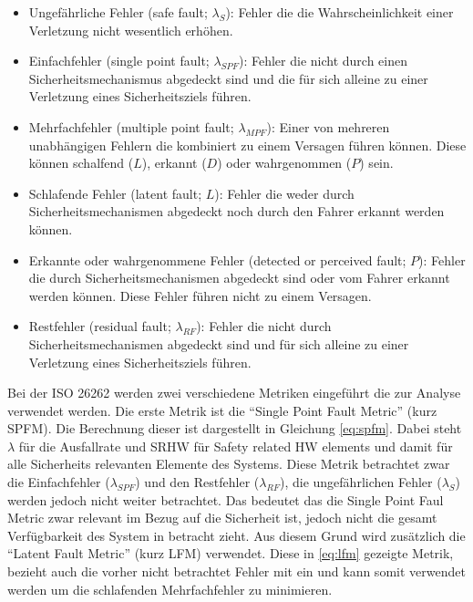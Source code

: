 \documentclass[a4paper,DIV=calc,ngerman]{scrartcl}
\begin{document}
\begin{itemize}
    \item Ungefährliche Fehler (safe fault; $ \lambda_S $): Fehler die die Wahrscheinlichkeit einer Verletzung nicht wesentlich erhöhen.
    \item Einfachfehler (single point fault; $ \lambda_{SPF} $): Fehler die nicht durch einen Sicherheitsmechanismus abgedeckt sind und die für sich alleine zu einer Verletzung eines Sicherheitsziels führen.
    \item Mehrfachfehler (multiple point fault; $ \lambda_{MPF} $): Einer von mehreren unabhängigen Fehlern die kombiniert zu einem Versagen führen können. Diese können schalfend ($L$), erkannt ($D$) oder wahrgenommen ($P$) sein.
    \item Schlafende Fehler (latent fault; $ L $): Fehler die weder durch Sicherheitsmechanismen abgedeckt noch durch den Fahrer erkannt werden können.
    \item Erkannte oder wahrgenommene Fehler (detected or perceived fault; $ P $): Fehler die durch Sicherheitsmechanismen abgedeckt sind oder vom Fahrer erkannt werden können. Diese Fehler führen nicht zu einem Versagen.
    \item Restfehler (residual fault; $ \lambda_{RF} $): Fehler die nicht durch Sicherheitsmechanismen abgedeckt sind und für sich alleine zu einer Verletzung eines Sicherheitsziels führen.
\end{itemize}

Bei der ISO 26262 werden zwei verschiedene Metriken eingeführt die zur Analyse verwendet werden. Die erste Metrik ist die "`Single Point Fault Metric"' (kurz SPFM). Die Berechnung dieser ist dargestellt in Gleichung \ref{eq:spfm}. Dabei steht $ \lambda $ für die Ausfallrate und SRHW für Safety related HW elements und damit für alle Sicherheits relevanten Elemente des Systems. Diese Metrik betrachtet zwar die Einfachfehler ($ \lambda_{SPF} $) und den Restfehler ($ \lambda_{RF} $), die ungefährlichen Fehler ($ \lambda_{S} $) werden jedoch nicht weiter betrachtet. Das bedeutet das die Single Point Faul Metric zwar relevant im Bezug auf die Sicherheit ist, jedoch nicht die gesamt Verfügbarkeit des System in betracht zieht. Aus diesem Grund wird zusätzlich die "`Latent Fault Metric"' (kurz LFM) verwendet. Diese in \ref{eq:lfm} gezeigte Metrik, bezieht auch die vorher nicht betrachtet Fehler mit ein und kann somit verwendet werden um die schlafenden Mehrfachfehler zu minimieren. 

\end{document}
